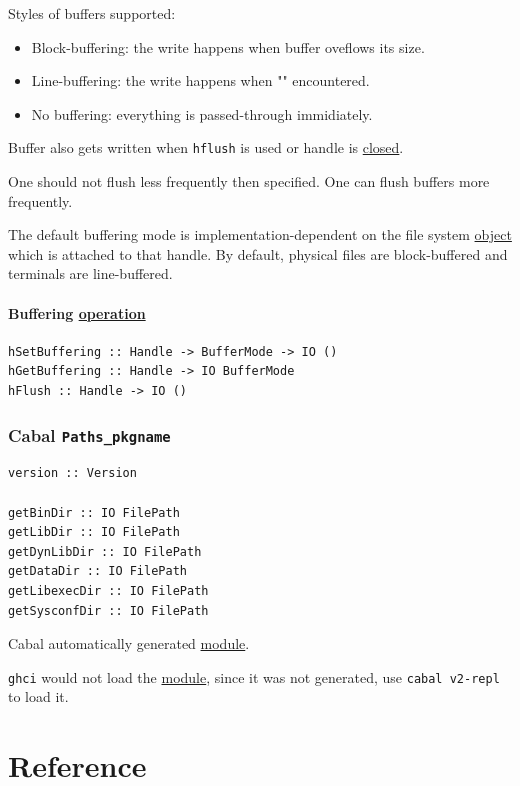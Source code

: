 \documentclass[a4paper,14pt,oneside]{book}
\begin{document}
Styles of buffers supported:

\begin{itemize}
\item Block-buffering: the write happens when buffer oveflows its size.
\item Line-buffering: the write happens when "\n" encountered.
\item No buffering: everything is passed-through immidiately.
\end{itemize}

Buffer also gets written when \texttt{hflush} is used or handle is \hyperref[orga531cc1]{closed}.

One should not flush less frequently then specified.
One can flush buffers more frequently.

The default buffering mode is implementation-dependent on the file system \hyperref[org431f16b]{object} which is attached to that handle. By default, physical files are block-buffered and terminals are line-buffered.

\subsection{Buffering \hyperref[org8c71e94]{operation}}
\label{sec:orga825cd4}

\begin{verbatim}
hSetBuffering :: Handle -> BufferMode -> IO ()
hGetBuffering :: Handle -> IO BufferMode
hFlush :: Handle -> IO ()
\end{verbatim}

\section{Cabal \texttt{Paths\_pkgname}}
\label{sec:org2bef3cb}

\begin{verbatim}
version :: Version

getBinDir :: IO FilePath
getLibDir :: IO FilePath
getDynLibDir :: IO FilePath
getDataDir :: IO FilePath
getLibexecDir :: IO FilePath
getSysconfDir :: IO FilePath
\end{verbatim}

Cabal automatically generated \hyperref[org67efd1f]{module}.

\texttt{ghci} would not load the \hyperref[org67efd1f]{module}, since it was not generated, use \texttt{cabal v2-repl} to load it.

\part{Reference}
\label{sec:org2dea4c3}
\end{document}

